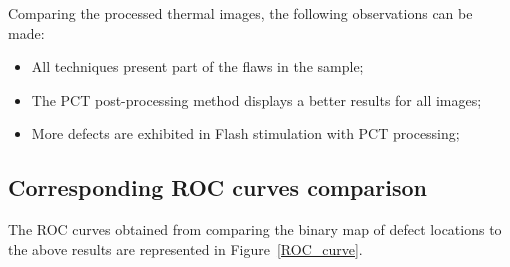 \documentclass[]{spie}  %
\begin{document}
Comparing the processed thermal images, the following observations can be made:  
\begin{itemize}
    \item All techniques present part of the flaws in the sample;
    \item The PCT post-processing method displays a better results for all images;
    \item More defects are exhibited in Flash stimulation with PCT processing;
\end{itemize}


\subsection{Corresponding ROC curves comparison}
The ROC curves obtained from comparing the binary map of defect locations to the above results are represented in Figure~\ref{ROC_curve}.
\end{document}
